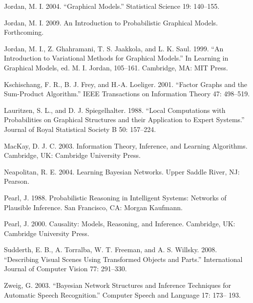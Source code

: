 Jordan, M. I. 2004. “Graphical Models.” Statistical Science 19: 140--155.

Jordan, M. I. 2009. An Introduction to Probabilistic Graphical Models. Forthcoming.

Jordan, M. I., Z. Ghahramani, T. S. Jaakkola, and L. K. Saul. 1999. “An Introduction to Variational Methods for Graphical Models.” In Learning in Graphical Models, ed. M. I. Jordan, 105--161. Cambridge, MA: MIT Press.

Kschischang, F. R., B. J. Frey, and H.-A. Loeliger. 2001. “Factor Graphs and the Sum-Product Algorithm.” IEEE Transactions on Information Theory 47: 498--519.

Lauritzen, S. L., and D. J. Spiegelhalter. 1988. “Local Computations with Probabilities on Graphical Structures and their Application to Expert Systems.” Journal of Royal Statistical Society B 50: 157--224.

MacKay, D. J. C. 2003. Information Theory, Inference, and Learning Algorithms. Cambridge, UK: Cambridge University Press.

Neapolitan, R. E. 2004. Learning Bayesian Networks. Upper Saddle River, NJ: Pearson.

Pearl, J. 1988. Probabilistic Reasoning in Intelligent Systems: Networks of Plausible Inference. San Francisco, CA: Morgan Kaufmann.

Pearl, J. 2000. Causality: Models, Reasoning, and Inference. Cambridge, UK: Cambridge University Press.

Sudderth, E. B., A. Torralba, W. T. Freeman, and A. S. Willsky. 2008. “Describing Visual Scenes Using Transformed Objects and Parts.” International Journal of Computer Vision 77: 291--330.

Zweig, G. 2003. “Bayesian Network Structures and Inference Techniques for Automatic Speech Recognition.” Computer Speech and Language 17: 173-- 193.
